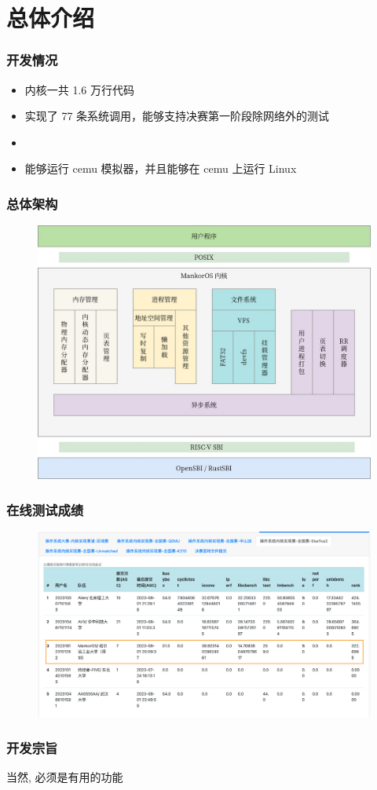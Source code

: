 \section{总体介绍}

\begin{frame}
    \frametitle{开发情况}

    \begin{itemize}
        \item 内核一共 1.6 万行代码
        \item 实现了 77 条系统调用，能够支持决赛第一阶段除网络外的测试
        \item {}
        \item 能够运行 cemu 模拟器，并且能够在 cemu 上运行 Linux
    \end{itemize}

\end{frame}

\begin{frame}
    \frametitle{总体架构}
    \begin{figure}
        \includegraphics[width=.6\textwidth]{assets/Arch.jpg}
    \end{figure}

\end{frame}

\begin{frame}
    \frametitle{在线测试成绩}
    \begin{figure}
        \centering
        \includegraphics[width=.7\textwidth]{assets/rank.png}
    \end{figure}

\end{frame}

\begin{frame}
    \frametitle{开发宗旨}

    \vfill
    \begin{center}
        \begin{LARGE}
        \end{LARGE}

        \hspace*{\fill}

        当然, 必须是有用的功能
    \end{center}
    \vfill
\end{frame}